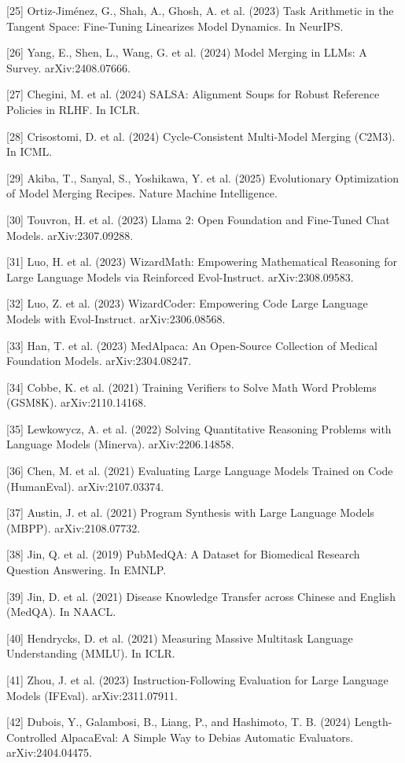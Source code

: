 \documentclass{article}
\begin{document}
{[25] Ortiz-Jiménez, G., Shah, A., Ghosh, A. et al. (2023) Task Arithmetic in the Tangent Space: Fine-Tuning Linearizes Model Dynamics. In NeurIPS.

[26] Yang, E., Shen, L., Wang, G. et al. (2024) Model Merging in LLMs: A Survey. arXiv:2408.07666.

[27] Chegini, M. et al. (2024) SALSA: Alignment Soups for Robust Reference Policies in RLHF. In ICLR.

[28] Crisostomi, D. et al. (2024) Cycle-Consistent Multi-Model Merging (C2M3). In ICML.

[29] Akiba, T., Sanyal, S., Yoshikawa, Y. et al. (2025) Evolutionary Optimization of Model Merging Recipes. Nature Machine Intelligence.

[30] Touvron, H. et al. (2023) Llama 2: Open Foundation and Fine-Tuned Chat Models. arXiv:2307.09288.

[31] Luo, H. et al. (2023) WizardMath: Empowering Mathematical Reasoning for Large Language Models via Reinforced Evol-Instruct. arXiv:2308.09583.

[32] Luo, Z. et al. (2023) WizardCoder: Empowering Code Large Language Models with Evol-Instruct. arXiv:2306.08568.

[33] Han, T. et al. (2023) MedAlpaca: An Open-Source Collection of Medical Foundation Models. arXiv:2304.08247.

[34] Cobbe, K. et al. (2021) Training Verifiers to Solve Math Word Problems (GSM8K). arXiv:2110.14168.

[35] Lewkowycz, A. et al. (2022) Solving Quantitative Reasoning Problems with Language Models (Minerva). arXiv:2206.14858.

[36] Chen, M. et al. (2021) Evaluating Large Language Models Trained on Code (HumanEval). arXiv:2107.03374.

[37] Austin, J. et al. (2021) Program Synthesis with Large Language Models (MBPP). arXiv:2108.07732.

[38] Jin, Q. et al. (2019) PubMedQA: A Dataset for Biomedical Research Question Answering. In EMNLP.

[39] Jin, D. et al. (2021) Disease Knowledge Transfer across Chinese and English (MedQA). In NAACL.

[40] Hendrycks, D. et al. (2021) Measuring Massive Multitask Language Understanding (MMLU). In ICLR.

[41] Zhou, J. et al. (2023) Instruction-Following Evaluation for Large Language Models (IFEval). arXiv:2311.07911.

[42] Dubois, Y., Galambosi, B., Liang, P., and Hashimoto, T. B. (2024) Length-Controlled AlpacaEval: A Simple Way to Debias Automatic Evaluators. arXiv:2404.04475.
}


\newpage
\end{document}
